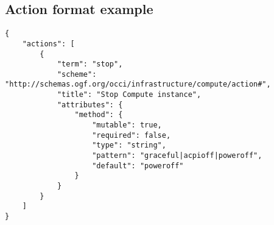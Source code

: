 \documentclass[10pt,a4paper]{article}
\begin{document}
\subsection{Action format example}
\label{sec:example_action}

\begin{verbatim}
{
    "actions": [
        {
            "term": "stop",
            "scheme": "http://schemas.ogf.org/occi/infrastructure/compute/action#",
            "title": "Stop Compute instance",
            "attributes": {
                "method": {
                    "mutable": true,
                    "required": false,
                    "type": "string",
                    "pattern": "graceful|acpioff|poweroff",
                    "default": "poweroff"
                }
            }
        }
    ]
}
\end{verbatim}
\end{document}
